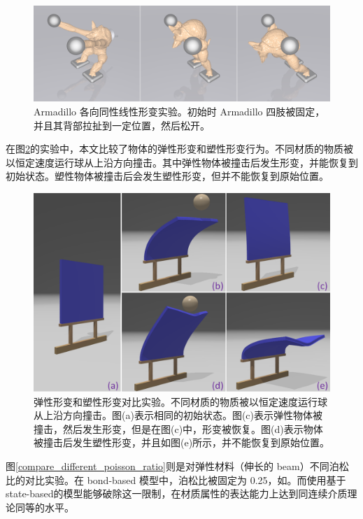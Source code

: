 \begin{figure}[!htb]
  \centering
  \captionsetup{justification=centering}
  \includegraphics[width=0.9\linewidth]{chap/image/demo_pull_armadillo}

  \caption{\label{demo_pull_armadillo}
           Armadillo 各向同性线性形变实验。初始时 Armadillo 四肢被固定，并且其背部拉扯到一定位置，然后松开。
          }
\end{figure}

在图\ref{demo_impact_upside}的实验中，本文比较了物体的弹性形变和塑性形变行为。不同材质的物质被以恒定速度运行球从上沿方向撞击。其中弹性物体被撞击后发生形变，并能恢复到初始状态。塑性物体被撞击后会发生塑性形变，但并不能恢复到原始位置。

\begin{figure}[!htb]
  \centering
  \captionsetup{justification=centering}
  \includegraphics[width=0.7\linewidth]{chap/image/demo_impact_upside}

  \caption{\label{demo_impact_upside}
           弹性形变和塑性形变对比实验。不同材质的物质被以恒定速度运行球从上沿方向撞击。图(a)表示相同的初始状态。图(c)表示弹性物体被撞击，然后发生形变，但是在图(c)中，形变被恢复。图(d)表示物体被撞击后发生塑性形变，并且如图(e)所示，并不能恢复到原始位置。
          }
\end{figure}

图\ref{compare_different_poisson_ratio}则是对弹性材料（伸长的 beam）不同泊松比的对比实验。在 bond-based 模型中，泊松比被固定为 0.25，如。而使用基于 state-based的模型能够破除这一限制，在材质属性的表达能力上达到同连续介质理论同等的水平。

